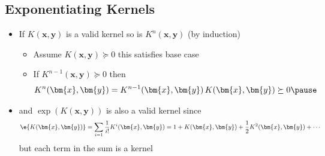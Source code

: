 \begin{slide}
\section{Exponentiating Kernels}

\begin{PauseHighLight}
  \begin{itemize}
  \item If $K(\bm{x}, \bm{y})$ is a valid kernel so is 
    $K^n(\bm{x}, \bm{y})$ (by induction)\pause
    \begin{itemize}\squeeze
    \item Assume $K(\bm{x}, \bm{y}) \succeq 0$ this satisfies base case\pause
    \item If $K^{n-1} (\bm{x}, \bm{y})\succeq 0$ then
      \begin{align*}
        K^{n}(\bm{x}, \bm{y}) = K^{n-1} (\bm{x}, \bm{y}) \, K(\bm{x}, \bm{y})\succeq 0\pause
      \end{align*}
    \end{itemize}
  \item and $\exp(K(\bm{x}, \bm{y}))$ is also a valid kernel since
    \begin{align*}
      \e{K(\bm{x}, \bm{y})} = \sum_{i=1} \frac{1}{i!} K^i(\bm{x}, \bm{y})
      = 1 + K(\bm{x}, \bm{y}) + \frac{1}{2} K^2(\bm{x}, \bm{y}) + \cdots
    \end{align*}
    but each term in the sum is a kernel\pause
  \end{itemize}
\end{PauseHighLight}

\end{slide}


